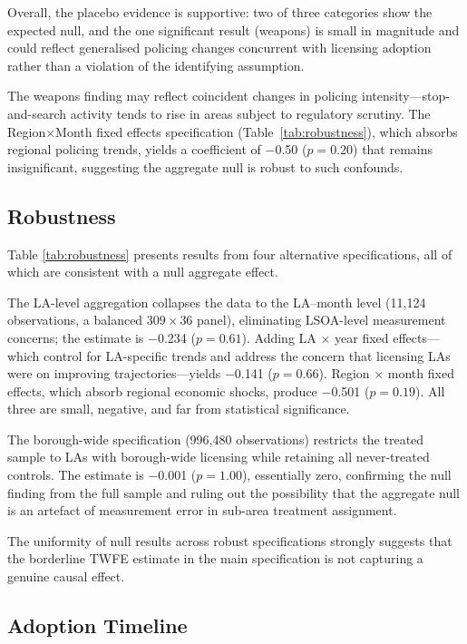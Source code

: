 \documentclass[12pt]{article}
\begin{document}
Overall, the placebo evidence is supportive: two of three categories show the expected null, and the one significant result (weapons) is small in magnitude and could reflect generalised policing changes concurrent with licensing adoption rather than a violation of the identifying assumption.

The weapons finding may reflect coincident changes in policing intensity---stop-and-search activity tends to rise in areas subject to regulatory scrutiny. The Region$\times$Month fixed effects specification (Table~\ref{tab:robustness}), which absorbs regional policing trends, yields a coefficient of $-$0.50 ($p=0.20$) that remains insignificant, suggesting the aggregate null is robust to such confounds.

\subsection{Robustness}



Table \ref{tab:robustness} presents results from four alternative specifications, all of which are consistent with a null aggregate effect.

The LA-level aggregation collapses the data to the LA--month level (11{,}124 observations, a balanced $309 \times 36$ panel), eliminating LSOA-level measurement concerns; the estimate is $-$0.234 ($p = 0.61$). Adding LA $\times$ year fixed effects---which control for LA-specific trends and address the concern that licensing LAs were on improving trajectories---yields $-$0.141 ($p = 0.66$). Region $\times$ month fixed effects, which absorb regional economic shocks, produce $-$0.501 ($p = 0.19$). All three are small, negative, and far from statistical significance.

The borough-wide specification (996{,}480 observations) restricts the treated sample to LAs with borough-wide licensing while retaining all never-treated controls. The estimate is $-$0.001 ($p = 1.00$), essentially zero, confirming the null finding from the full sample and ruling out the possibility that the aggregate null is an artefact of measurement error in sub-area treatment assignment.

The uniformity of null results across robust specifications strongly suggests that the borderline TWFE estimate in the main specification is not capturing a genuine causal effect.

\subsection{Adoption Timeline}
\end{document}
